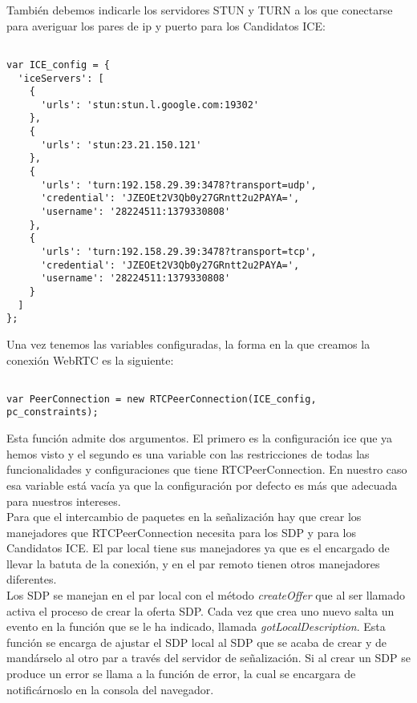 También debemos indicarle los servidores STUN y TURN a los que conectarse para averiguar los pares de ip y puerto para los Candidatos ICE:\\

\begin{lstlisting}[caption=Servidores STUN y TURN]

var ICE_config = {
  'iceServers': [
    {
      'urls': 'stun:stun.l.google.com:19302'
    },
    {
      'urls': 'stun:23.21.150.121'
    },
    {
      'urls': 'turn:192.158.29.39:3478?transport=udp',
      'credential': 'JZEOEt2V3Qb0y27GRntt2u2PAYA=',
      'username': '28224511:1379330808'
    },
    {
      'urls': 'turn:192.158.29.39:3478?transport=tcp',
      'credential': 'JZEOEt2V3Qb0y27GRntt2u2PAYA=',
      'username': '28224511:1379330808'
    }
  ]
};

\end{lstlisting}

Una vez tenemos las variables configuradas, la forma en la que creamos la conexión WebRTC es la siguiente:\\

\begin{lstlisting}[caption=RTCPeerConnection.]

var PeerConnection = new RTCPeerConnection(ICE_config, pc_constraints);

\end{lstlisting}

Esta función admite dos argumentos. El primero es la configuración ice que ya hemos visto y el segundo es una variable con las restricciones de todas las funcionalidades y configuraciones que tiene RTCPeerConnection. En nuestro caso esa variable está vacía ya que la configuración por defecto es más que adecuada para nuestros intereses.\\

Para que el intercambio de paquetes en la señalización hay que crear los manejadores que RTCPeerConnection necesita para los SDP y para los Candidatos ICE. El par local tiene sus manejadores ya que es el encargado de llevar la batuta de la conexión, y en el par remoto tienen otros manejadores diferentes. \\

Los SDP se manejan en el par local con el método \emph{createOffer} que al ser llamado activa el proceso de crear la oferta SDP. Cada vez que crea uno nuevo salta un evento en la función que se le ha indicado, llamada \emph{gotLocalDescription}. Esta función se encarga de ajustar el SDP local al SDP que se acaba de crear y de mandárselo al otro par a través del servidor de señalización. Si al crear un SDP se produce un error se llama a la función de error, la cual se encargara de notificárnoslo en la consola del navegador.\\


